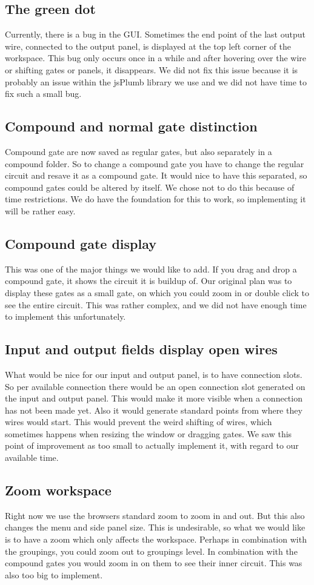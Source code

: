 \subsection{The green dot}
Currently, there is a bug in the GUI. Sometimes the end point of the last output wire, connected to the output panel, is displayed at the top left corner of the workspace. This bug only occurs once in a while and after hovering over the wire or shifting gates or panels, it disappears. We did not fix this issue because it is probably an issue within the jsPlumb library we use and we did not have time to fix such a small bug.

\subsection{Compound and normal gate distinction}
Compound gate are now saved as regular gates, but also separately in a compound folder. So to change a compound gate you have to change the regular circuit and resave it as a compound gate. It would nice to have this separated, so compound gates could be altered by itself.
We chose not to do this because of time restrictions. We do have the foundation for this to work, so implementing it will be rather easy.

\subsection{Compound gate display}
This was one of the major things we would like to add. If you drag and drop a compound gate, it shows the circuit it is buildup of. Our original plan was to display these gates as a small gate, on which you could zoom in or double click to see the entire circuit. This was rather complex, and we did not have enough time to implement this unfortunately.

\subsection{Input and output fields display open wires}
What would be nice for our input and output panel, is to have connection slots. So per available connection there would be an open connection slot generated on the input and output panel. This would make it more visible when a connection has not been made yet. Also it would generate standard points from where they wires would start. This would prevent the weird shifting of wires, which sometimes happens when resizing the window or dragging gates.
We saw this point of improvement as too small to actually implement it, with regard to our available time.

\subsection{Zoom workspace}
Right now we use the browsers standard zoom to zoom in and out. But this also changes the menu and side panel size. This is undesirable, so what we would like is to have a zoom which only affects the workspace. Perhaps in combination with the groupings, you could zoom out to groupings level. In combination with the compound gates you would zoom in on them to see their inner circuit. This was also too big to implement.

